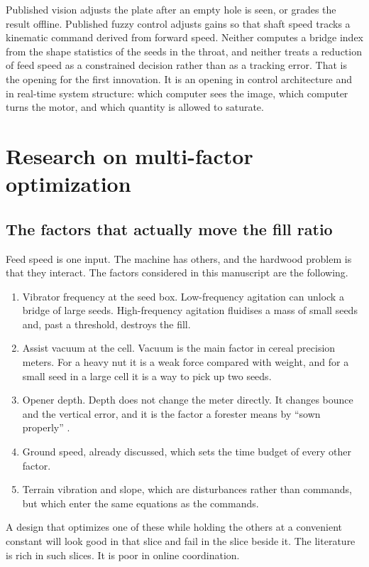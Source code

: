 Published vision adjusts the plate after an empty hole is seen, or grades the result offline. Published fuzzy control adjusts gains so that shaft speed tracks a kinematic command derived from forward speed. Neither computes a bridge index from the shape statistics of the seeds in the throat, and neither treats a reduction of feed speed as a constrained decision rather than as a tracking error. That is the opening for the first innovation. It is an opening in control architecture and in real-time system structure: which computer sees the image, which computer turns the motor, and which quantity is allowed to saturate.

\section{Research on multi-factor optimization}
\label{sec:tech2lit}

\subsection{The factors that actually move the fill ratio}

Feed speed is one input. The machine has others, and the hardwood problem is that they interact. The factors considered in this manuscript are the following.

\begin{enumerate}
\item Vibrator frequency at the seed box. Low-frequency agitation can unlock a bridge of large seeds. High-frequency agitation fluidises a mass of small seeds and, past a threshold, destroys the fill.
\item Assist vacuum at the cell. Vacuum is the main factor in cereal precision meters. For a heavy nut it is a weak force compared with weight, and for a small seed in a large cell it is a way to pick up two seeds.
\item Opener depth. Depth does not change the meter directly. It changes bounce and the vertical error, and it is the factor a forester means by ``sown properly'' \cite{lof2019}.
\item Ground speed, already discussed, which sets the time budget of every other factor.
\item Terrain vibration and slope, which are disturbances rather than commands, but which enter the same equations as the commands.
\end{enumerate}

A design that optimizes one of these while holding the others at a convenient constant will look good in that slice and fail in the slice beside it. The literature is rich in such slices. It is poor in online coordination.

